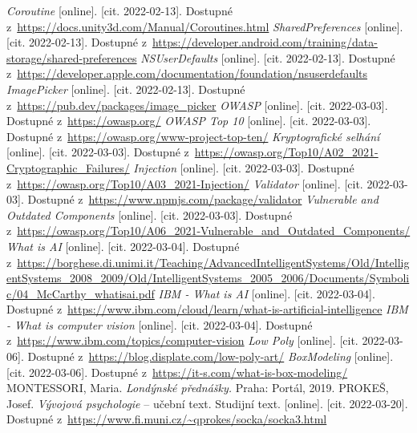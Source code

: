 \begin{thebibliography}{99}
     \textit{Coroutine} [online]. [cit. 2022-02-13]. Dostupné z~\url{https://docs.unity3d.com/Manual/Coroutines.html}
     \textit{SharedPreferences} [online]. [cit. 2022-02-13]. Dostupné z~\url{https://developer.android.com/training/data-storage/shared-preferences}
     \textit{NSUserDefaults} [online]. [cit. 2022-02-13]. Dostupné z~\url{https://developer.apple.com/documentation/foundation/nsuserdefaults}
     \textit{ImagePicker} [online]. [cit. 2022-02-13]. Dostupné z~\url{https://pub.dev/packages/image_picker}
     \textit{OWASP} [online]. [cit. 2022-03-03]. Dostupné z~\url{https://owasp.org/}
     \textit{OWASP Top 10} [online]. [cit. 2022-03-03]. Dostupné z~\url{https://owasp.org/www-project-top-ten/}
     \textit{Kryptografické selhání} [online]. [cit. 2022-03-03]. Dostupné z~\url{https://owasp.org/Top10/A02_2021-Cryptographic_Failures/}
     \textit{Injection} [online]. [cit. 2022-03-03]. Dostupné z~\url{https://owasp.org/Top10/A03_2021-Injection/}
     \textit{Validator} [online]. [cit. 2022-03-03]. Dostupné z~\url{https://www.npmjs.com/package/validator}
     \textit{Vulnerable and Outdated Components} [online]. [cit. 2022-03-03]. Dostupné z~\url{https://owasp.org/Top10/A06_2021-Vulnerable_and_Outdated_Components/}
     \textit{What is AI} [online]. [cit. 2022-03-04]. Dostupné z~\url{https://borghese.di.unimi.it/Teaching/AdvancedIntelligentSystems/Old/IntelligentSystems_2008_2009/Old/IntelligentSystems_2005_2006/Documents/Symbolic/04_McCarthy_whatisai.pdf}
     \textit{IBM - What is AI} [online]. [cit. 2022-03-04]. Dostupné z~\url{https://www.ibm.com/cloud/learn/what-is-artificial-intelligence}
     \textit{IBM - What is computer vision} [online]. [cit. 2022-03-04]. Dostupné z~\url{https://www.ibm.com/topics/computer-vision}
     \textit{Low Poly} [online]. [cit. 2022-03-06]. Dostupné z~\url{https://blog.displate.com/low-poly-art/}
     \textit{BoxModeling} [online]. [cit. 2022-03-06]. Dostupné z~\url{https://it-s.com/what-is-box-modeling/}
     MONTESSORI, Maria. \textit{Londýnské přednášky.}  Praha: Portál, 2019.
      PROKEŠ, Josef. \textit{Vývojová psychologie} – učební text. Studijní text. [online]. [cit. 2022-03-20]. Dostupné z~\url{https://www.fi.muni.cz/~qprokes/socka/socka3.html}

\end{thebibliography}
